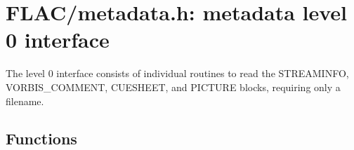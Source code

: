 \hypertarget{group__flac__metadata__level0}{}\section{F\+L\+A\+C/metadata.h\+: metadata level 0 interface}
\label{group__flac__metadata__level0}


The level 0 interface consists of individual routines to read the S\+T\+R\+E\+A\+M\+I\+N\+FO, V\+O\+R\+B\+I\+S\+\_\+\+C\+O\+M\+M\+E\+NT, C\+U\+E\+S\+H\+E\+ET, and P\+I\+C\+T\+U\+RE blocks, requiring only a filename.  


\subsection*{Functions}
